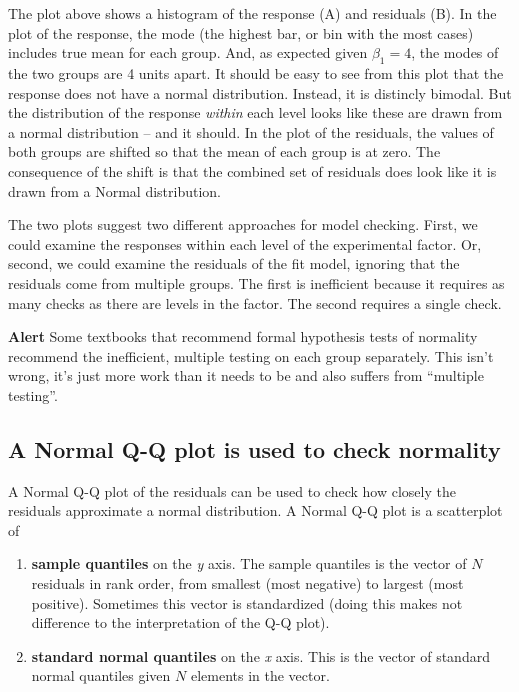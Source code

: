 \documentclass[]{book}
\providecommand{\tightlist}{%
  \setlength{\itemsep}{0pt}\setlength{\parskip}{0pt}}
\begin{document}
The plot above shows a histogram of the response (A) and residuals (B).
In the plot of the response, the mode (the highest bar, or bin with the
most cases) includes true mean for each group. And, as expected given
\(\beta_1=4\), the modes of the two groups are 4 units apart. It should
be easy to see from this plot that the response does not have a normal
distribution. Instead, it is distincly bimodal. But the distribution of
the response \emph{within} each level looks like these are drawn from a
normal distribution -- and it should. In the plot of the residuals, the
values of both groups are shifted so that the mean of each group is at
zero. The consequence of the shift is that the combined set of residuals
does look like it is drawn from a Normal distribution.

The two plots suggest two different approaches for model checking.
First, we could examine the responses within each level of the
experimental factor. Or, second, we could examine the residuals of the
fit model, ignoring that the residuals come from multiple groups. The
first is inefficient because it requires as many checks as there are
levels in the factor. The second requires a single check.

\textbf{Alert} Some textbooks that recommend formal hypothesis tests of
normality recommend the inefficient, multiple testing on each group
separately. This isn't wrong, it's just more work than it needs to be
and also suffers from ``multiple testing''.

\subsection{A Normal Q-Q plot is used to check
normality}\label{a-normal-q-q-plot-is-used-to-check-normality}

A Normal Q-Q plot of the residuals can be used to check how closely the
residuals approximate a normal distribution. A Normal Q-Q plot is a
scatterplot of

\begin{enumerate}
\def\labelenumi{\arabic{enumi}.}
\tightlist
\item
  \textbf{sample quantiles} on the \emph{y} axis. The sample quantiles
  is the vector of \(N\) residuals in rank order, from smallest (most
  negative) to largest (most positive). Sometimes this vector is
  standardized (doing this makes not difference to the interpretation of
  the Q-Q plot).
\item
  \textbf{standard normal quantiles} on the \emph{x} axis. This is the
  vector of standard normal quantiles given \(N\) elements in the
  vector.
\end{enumerate}
\end{document}
